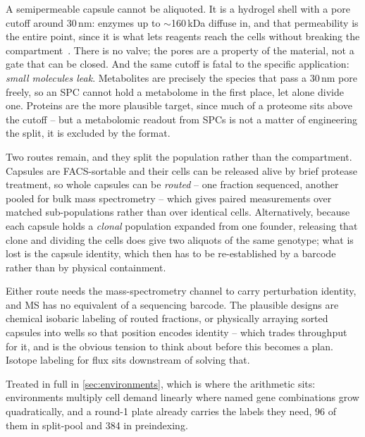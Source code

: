 A semipermeable capsule cannot be aliquoted. It is a hydrogel shell with a pore
cutoff around 30\,nm: enzymes up to $\sim$160\,kDa diffuse in, and that
permeability is the entire point, since it is what lets reagents reach the cells
without breaking the compartment~\citep{baronasHighthroughputSinglecellOmics2026}.
There is no valve; the pores are a property of the material, not a gate that can
be closed. And the same cutoff is fatal to the specific application: \emph{small
molecules leak}. Metabolites are precisely the species that pass a 30\,nm pore
freely, so an SPC cannot hold a metabolome in the first place, let alone divide
one. Proteins are the more plausible target, since much of a proteome sits above
the cutoff -- but a metabolomic readout from SPCs is not a matter of engineering
the split, it is excluded by the format.

Two routes remain, and they split the population rather than the compartment.
Capsules are FACS-sortable and their cells can be released alive by brief protease
treatment, so whole capsules can be \emph{routed} -- one fraction sequenced,
another pooled for bulk mass spectrometry -- which gives paired measurements over
matched sub-populations rather than over identical cells. Alternatively, because
each capsule holds a \emph{clonal} population expanded from one founder, releasing
that clone and dividing the cells does give two aliquots of the same genotype;
what is lost is the capsule identity, which then has to be re-established by a
barcode rather than by physical containment.

 Either route needs the mass-spectrometry channel to
carry perturbation identity, and MS has no equivalent of a sequencing barcode. The
plausible designs are chemical isobaric labeling of routed fractions, or
physically arraying sorted capsules into wells so that position encodes identity -- which trades throughput for it, and is the obvious tension to think about
before this becomes a plan. Isotope labeling for flux sits downstream of solving
that.

 Treated in full in
\cref{sec:environments}, which is where the arithmetic sits: environments
multiply cell demand linearly where named gene combinations grow quadratically,
and a round-1 plate already carries the labels they need, 96 of them in
split-pool and 384 in preindexing.
